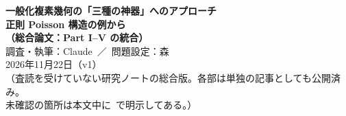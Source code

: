 

\sloppy
\begin{center}
{\LARGE\bfseries\sffamily 一般化複素幾何の「三種の神器」へのアプローチ}\\[6pt]
{\Large\bfseries\sffamily 正則 Poisson 構造の例から\\（総合論文：Part I--V の統合）}\\[12pt]
{\large 調査・執筆：Claude\ ／\ 問題設定：森}\\[3pt]
2026年11月22日（v1）\\[3pt]
{\small （査読を受けていない研究ノートの総合版。各部は単独の記事としても公開済み。\\未確認の箇所は本文中に\tQ\ で明示してある。）}
\end{center}
\begin{abstract}\noindent
複素幾何の三種の神器（Riemann--Roch、Serre 消滅、Kodaira 埋め込み）の一般化複素幾何版を、最も簡単な非自明な例（正則 Poisson 構造 $\sigma$ の $\beta$-変換で得る、型が跳ぶ一般化複素構造と、その上の一般化正則直線束 $L$）から調べた Part I--V をまとめる。
(1) 一般化正則構造は Poisson 加群であり、$\sigma$ が対数シンプレクティックなら平坦な対数接続で、留数 $r_i$ が定数になる。
(2) Serre 型の消滅は「横断次数での消滅」として成り立ち、全次数では成り立たない。双対性 $\HH^k(L)^*\cong\HH^{2n-k}(L^\vee\otimes K^2)$ が任意次元で成り立つ。
(3) 全 Euler 標数は $(-1)^n\rk(E)\chi(X)$ で $c_1$ に依らない。曲面・トーリックでは Poincar\'e 多項式を留数で書き下し、準斉次な特異点の局所公式を証明した。
(4) 正則型では次数ごとに $m$ の多項式、対数シンプレクティック型では周期的となる。一般次元は簡約定理により条件 (GEN$'$) に帰着する。
(5) Kodaira 型では、一般化正則切断による埋め込みは不可能であり、葉空間版とトーリックの Poisson--Kodaira を示した。
指数定理（重み付き b-計算）の一般化は予想にとどまり、一般の一般化 Kodaira 埋め込みは未解決である。
\end{abstract}
\tableofcontents
\clearpage


\clearpage




